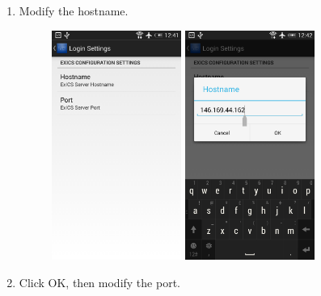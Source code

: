 \begin{enumerate}
\FloatBarrier
\clearpage
\FloatBarrier

\item Modify the hostname.

\begin{figure}[!htbp]
	\centering
	\includegraphics[width=0.4\textwidth]{"screenshots/User guide/3"}
	\includegraphics[width=0.4\textwidth]{"screenshots/User guide/4"}
\end{figure}

\FloatBarrier
\clearpage
\FloatBarrier

\item Click OK, then modify the port.


\end{enumerate}
